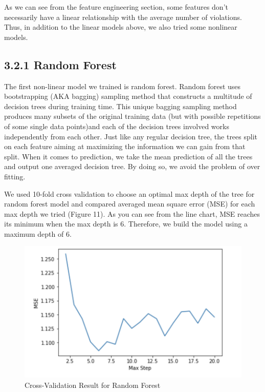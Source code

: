 \documentclass[letterpaper, 11 pt, conference]{ieeeconf}
\begin{document}
As we can see from the feature engineering section, some features don't necessarily have a linear relationship with the average number of violations. Thus, in addition to the linear models above, we also tried some nonlinear models. 
\subsection*{3.2.1 Random Forest}

The first non-linear model we trained is random forest. Random forest uses bootstrapping (AKA bagging) sampling method that constructs a multitude of decision trees during training time. This unique bagging sampling method produces many subsets of the original training data (but with possible repetitions of some single data points)and each of the decision trees involved works independently from each other. Just like any regular decision tree, the trees split on each feature aiming at maximizing the information we can gain from that split. When it comes to prediction, we take the mean prediction of all the trees and output one averaged decision tree. By doing so, we avoid the problem of over fitting. 

We used 10-fold cross validation to choose an optimal max depth of the tree for random forest model and compared averaged mean square error (MSE) for each max depth we tried (Figure 11). As you can see from the line chart, MSE reaches its minimum when the max depth is 6. Therefore, we build the model using a maximum depth of 6. 
\begin{figure}[h]
	\centering
    \includegraphics[scale = 0.55]{random_forest_cv_graph}
    \caption{Cross-Validation Result for Random Forest}
\end{figure}
\end{document}
